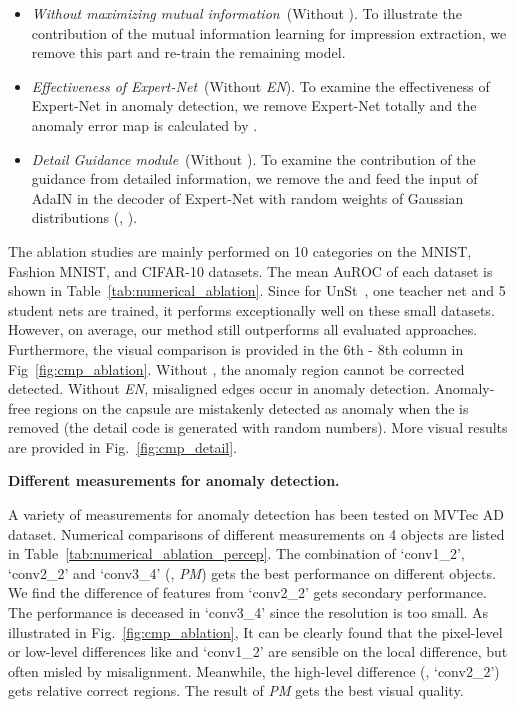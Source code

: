 \documentclass[final]{cvpr}
\begin{document}
	\begin{itemize}
		\setlength{\itemsep}{2pt}
		\setlength{\parsep}{-2pt}
		\setlength{\parskip}{0pt}
		
		\item \emph{Without maximizing mutual information}~(Without ). To illustrate the contribution of the mutual information learning for impression extraction, we remove this part and re-train the remaining model.
		\item \emph{Effectiveness of Expert-Net}~(Without \textit{EN}). To examine the effectiveness of Expert-Net in anomaly detection, we remove Expert-Net totally and the anomaly error map  is calculated by .
		\item \emph{Detail Guidance module}~(Without ). To examine the contribution of the guidance from detailed information, we remove the  and feed the input of AdaIN in the decoder of Expert-Net with random weights of Gaussian distributions (\ie, ).
	\end{itemize}
The ablation studies are mainly performed on 10 categories on the MNIST, Fashion MNIST, and CIFAR-10 datasets. The mean AuROC of each dataset is shown in Table~\ref{tab:numerical_ablation}. Since for UnSt~\cite{A:bergmann2020uninformed}, one teacher net and 5 student nets are trained, it performs exceptionally well on these small datasets. However, on average, our method still outperforms all evaluated approaches.
Furthermore, the visual comparison is provided in the 6th - 8th column in Fig~\ref{fig:cmp_ablation}. Without , the anomaly region cannot be corrected detected. Without \textit{EN}, misaligned edges occur in anomaly detection. Anomaly-free regions on the capsule are mistakenly detected as anomaly when the  is removed (the detail code  is generated with random numbers). More visual results are provided in Fig.~\ref{fig:cmp_detail}.


\noindent\textbf{Different measurements for anomaly detection.}

A variety of measurements for anomaly detection has been tested on MVTec AD dataset. Numerical comparisons of different measurements on 4 objects are listed in Table~\ref{tab:numerical_ablation_percep}. The combination of `conv1\_2', `conv2\_2' and `conv3\_4' (\ie, \textit{PM}) gets the best performance on different objects.
We find the difference of features from  `conv2\_2' gets secondary performance. The performance is deceased in `conv3\_4' since the resolution is too small. 
As illustrated in Fig.~\ref{fig:cmp_ablation}, 
It can be clearly found that the pixel-level or low-level differences like  and `conv1\_2' are sensible on the local difference, but often misled by misalignment. Meanwhile, the high-level difference (\ie, `conv2\_2') gets relative correct regions. The result of \textit{PM} gets the best visual quality.
\end{document}
